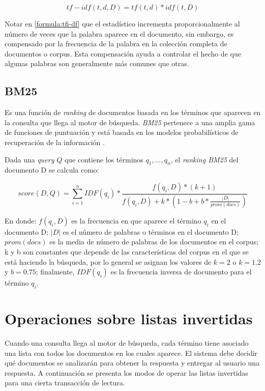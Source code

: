 \begin{equation}
\label{formula:tfi-df}
tf-idf(t,d,D) = tf(t,d) * idf(t,D)
\end{equation}

Notar en \eqref{formula:tfi-df} que el estadístico incrementa proporcionalmente al número de veces que la palabra aparece en el documento, sin embargo, es compensado por la frecuencia de la palabra en la colección completa de documentos o corpus. Esta compensación ayuda a controlar el hecho de que algunas palabras son generalmente más comunes que otras.


\subsection{BM25}
\label{marco:bm25}
Es una función de \textit{ranking} de documentos basada en los términos que aparecen en la consulta que llega al motor de búsqueda. \textit{BM25} pertenece a una amplia gama de funciones de puntuación y está basada en los modelos probabilísticos de recuperación de la información \citep{Baeza-Yates:2011}.

Dada una \textit{query} $Q$ que contiene los términos $q_{1},...,q_{n}$, el \textit{ranking BM25} del documento D se calcula como: 

\begin{equation}
\label{formula:bm25}
score(D,Q) =  \displaystyle\sum_{i=1}^n IDF(q_{i}) * \frac{f(q_{i},D)*(k+1)}{f(q_{i},D)+k * (1 - b + b * \frac{|D|}{prom(docs)})}
\end{equation}

En donde: $f(q_{i}, D)$ es la frecuencia en que aparece el término $q_{i}$ en el documento D; $|D|$ es el número de palabras o términos en el documento D; $prom(docs)$ es la media de número de palabras de los documentos en el corpus; k y b son constantes que depende de las características del corpus en el que se está haciendo la búsqueda, por lo general se asignan los valores de $k = 2$ o $k = 1.2$ y $b = 0.75$; finalmente, $IDF(q_{i})$ es la frecuencia inversa de documento para el término $q_{i}$.


\section{Operaciones sobre listas invertidas}
\label{marco:osli}
Cuando una consulta llega al motor de búsqueda, cada término tiene asociado una lista con todos los documentos en los cuales aparece. El sistema debe decidir qué documentos se analizarán para obtener la respuesta y entregar al usuario una respuesta. A continuación se presenta los modos de operar las listas invertidas para una cierta transacción de lectura.

